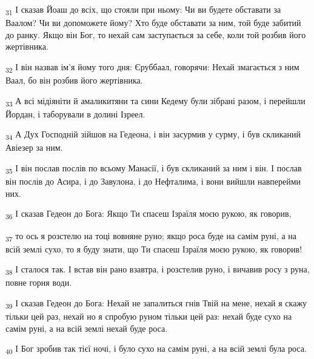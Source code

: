 \begin{tcolorbox}
\textsubscript{31} І сказав Йоаш до всіх, що стояли при ньому: Чи ви будете обставати за Ваалом? Чи ви допоможете йому? Хто буде обставати за ним, той буде забитий до ранку. Якщо він Бог, то нехай сам заступається за себе, коли той розбив його жертівника.
\end{tcolorbox}
\begin{tcolorbox}
\textsubscript{32} І він назвав ім'я йому того дня: Єруббаал, говорячи: Нехай змагається з ним Ваал, бо він розбив його жертівника.
\end{tcolorbox}
\begin{tcolorbox}
\textsubscript{33} А всі мідіяніти й амаликитяни та сини Кедему були зібрані разом, і перейшли Йордан, і таборували в долині Ізреел.
\end{tcolorbox}
\begin{tcolorbox}
\textsubscript{34} А Дух Господній зійшов на Гедеона, і він засурмив у сурму, і був скликаний Авіезер за ним.
\end{tcolorbox}
\begin{tcolorbox}
\textsubscript{35} І він послав послів по всьому Манасії, і був скликаний за ним і він. І послав він послів до Асира, і до Завулона, і до Нефталима, і вони вийшли навперейми них.
\end{tcolorbox}
\begin{tcolorbox}
\textsubscript{36} І сказав Гедеон до Бога: Якщо Ти спасеш Ізраїля моєю рукою, як говорив,
\end{tcolorbox}
\begin{tcolorbox}
\textsubscript{37} то ось я розстелю на тоці вовняне руно; якщо роса буде на самім руні, а на всій землі сухо, то я буду знати, що Ти спасеш Ізраїля моєю рукою, як говорив!
\end{tcolorbox}
\begin{tcolorbox}
\textsubscript{38} І сталося так. І встав він рано взавтра, і розстелив руно, і вичавив росу з руна, повне горня води.
\end{tcolorbox}
\begin{tcolorbox}
\textsubscript{39} І сказав Гедеон до Бога: Нехай не запалиться гнів Твій на мене, нехай я скажу тільки цей раз, нехай но я спробую руном тільки цей раз: нехай буде сухо на самім руні, а на всій землі нехай буде роса.
\end{tcolorbox}
\begin{tcolorbox}
\textsubscript{40} І Бог зробив так тієї ночі, і було сухо на самім руні, а на всій землі була роса.
\end{tcolorbox}
